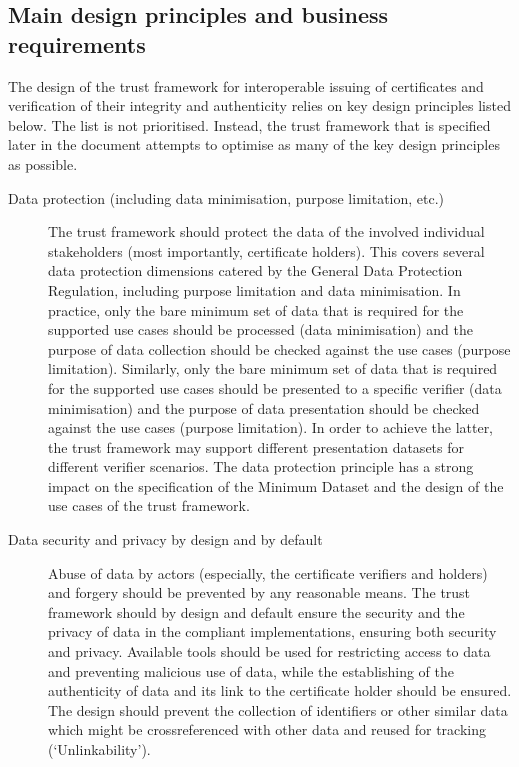 \documentclass[letterpaper,10pt,english]{sphinxmanual}
\begin{document}
\subsection{Main design principles and business requirements}
\label{\detokenize{privacycred:main-design-principles-and-business-requirements}}
\sphinxAtStartPar
The design of the trust framework for interoperable issuing of certificates and verification of their integrity and authenticity relies on key design principles listed below. The list is not prioritised. Instead, the trust framework that is specified later in the document attempts to optimise as many of the key design principles as possible.
\begin{description}
\item[{Data protection (including data minimisation, purpose limitation, etc.)}] \leavevmode
\sphinxAtStartPar
The trust framework should protect the data of the involved individual stakeholders (most importantly, certificate holders). This covers several data protection dimensions catered by the General Data Protection Regulation, including purpose limitation and data minimisation. In practice, only the bare minimum set of data that is required for the supported use cases should be processed (data minimisation) and the purpose of data collection should be checked against the use cases (purpose limitation). Similarly, only the bare minimum set of data that is required for the supported use cases should be presented to a specific verifier (data minimisation) and the purpose of data presentation should be checked against the use cases (purpose limitation). In order to achieve the latter, the trust framework may support different presentation datasets for different verifier scenarios. The data protection principle has a strong impact on the specification of the Minimum Dataset and the design of the use cases of the trust framework.

\item[{Data security and privacy by design and by default}] \leavevmode
\sphinxAtStartPar
Abuse of data by actors (especially, the certificate verifiers and holders) and forgery should be prevented by any reasonable means. The trust framework should by design and default ensure the security and the privacy of data in the compliant implementations, ensuring both security and privacy. Available tools should be used for restricting access to data and preventing malicious use of data, while the establishing of the authenticity of data and its link to the certificate holder should be ensured. The design should prevent the collection of identifiers or other similar data which might be crossreferenced with other data and re\sphinxhyphen{}used for tracking (‘Unlinkability’).


\end{description}
\end{document}
